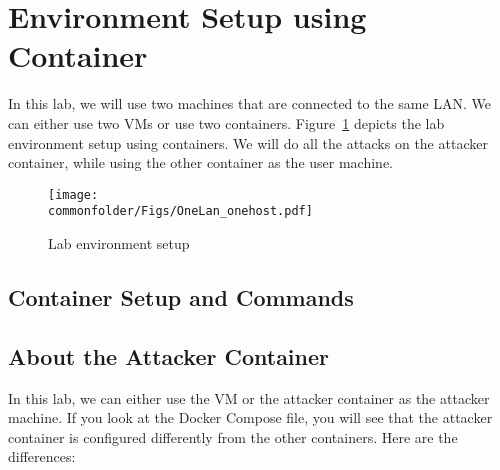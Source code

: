 \section{Environment Setup using Container} 

In this lab, we will use two machines that are connected
to the same LAN. We can either use two VMs or use two containers. 
Figure~\ref{fig:labsetup} depicts the lab environment setup using 
containers.
We will do all the attacks on the attacker container, while using
the other container as the user machine. 


\begin{figure}[htb]
\begin{center}
\texttt{[image: \\commonfolder/Figs/OneLan\_onehost.pdf]}
\end{center}
\caption{Lab environment setup}
\label{fig:labsetup}
\end{figure}
 

%
 


\subsection{Container Setup and Commands} 




\subsection{About the Attacker Container}

In this lab, we can either use the VM or the attacker container
as the attacker machine. If you look at the Docker Compose file, you will
see that the attacker container is configured differently from the other
containers. Here are the differences:



